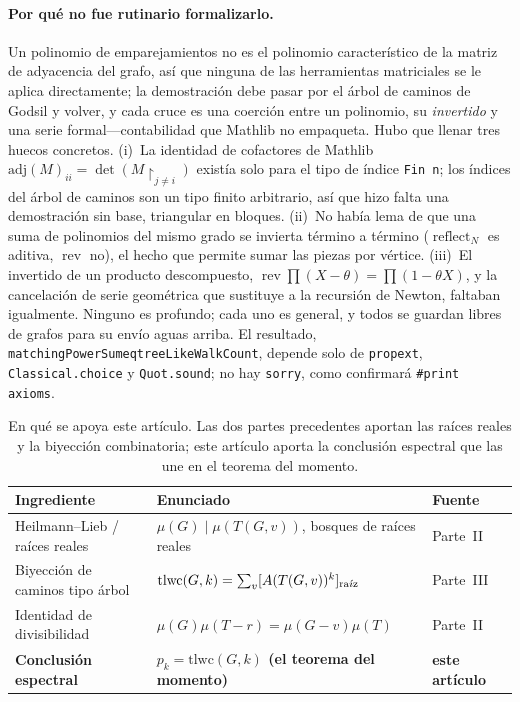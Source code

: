 \documentclass[11pt]{article}
\newcommand{\lean}[1]{{\def\_{\textunderscore\allowbreak}\texttt{#1}}}
\DeclareMathOperator{\reflect}{reflect}
\DeclareMathOperator{\rev}{rev}
\begin{document}
\paragraph{Por qu\'e no fue rutinario formalizarlo.} Un polinomio de emparejamientos no es el polinomio
caracter\'istico de la matriz de adyacencia del grafo, as\'i que ninguna de las herramientas matriciales se le aplica
directamente; la demostraci\'on debe pasar por el \'arbol de caminos de Godsil y volver, y cada cruce
es una coerci\'on entre un polinomio, su \emph{invertido} y una serie formal---contabilidad que Mathlib
no empaqueta. Hubo que llenar tres huecos concretos. (i)~La identidad de cofactores de Mathlib
$\mathrm{adj}(M)_{ii}=\det(M\!\restriction_{j\neq i})$ exist\'ia solo para el tipo de \'indice
\lean{Fin\,n}; los \'indices del \'arbol de caminos son un tipo finito arbitrario, as\'i que hizo falta
una demostraci\'on sin base, triangular en bloques. (ii)~No hab\'ia lema de que una suma de polinomios
del mismo grado se invierta t\'ermino a t\'ermino ($\reflect_N$ es aditiva, $\rev$ no), el hecho que
permite sumar las piezas por v\'ertice. (iii)~El invertido de un producto descompuesto,
$\rev\prod(X-\theta)=\prod(1-\theta X)$, y la cancelaci\'on de serie geom\'etrica que sustituye a la
recursi\'on de Newton, faltaban igualmente. Ninguno es profundo; cada uno es general, y todos se guardan
libres de grafos para su env\'io aguas arriba. El resultado, \lean{matchingPowerSum\_eq\_treeLikeWalkCount},
depende solo de \lean{propext}, \lean{Classical.choice} y \lean{Quot.sound}; no hay \lean{sorry}, como
confirmar\'a \lean{\#print axioms}.

\begin{table}[h]
\centering\small
\caption{En qu\'e se apoya este art\'iculo. Las dos partes precedentes aportan las ra\'ices reales y la
biyecci\'on combinatoria; este art\'iculo aporta la conclusi\'on espectral que las une en el teorema
del momento.}
\label{tab:deps}
\begin{tabular}{@{}lll@{}}
\toprule
\rowcolor{ggteal}
{\color{white}\textbf{Ingrediente}} & {\color{white}\textbf{Enunciado}} & {\color{white}\textbf{Fuente}}\\
\midrule
Heilmann--Lieb / ra\'ices reales & $\mu(G)\mid\mu(T(G,v))$, bosques de ra\'ices reales & Parte~II~\cite{PartII}\\
Biyecci\'on de caminos tipo \'arbol & $\mathrm{tlwc}(G,k)=\sum_v[A(T(G,v))^k]_{\rm ra\acute{\imath}z}$ & Parte~III~\cite{PartIII}\\
Identidad de divisibilidad & $\mu(G)\mu(T{-}r)=\mu(G{-}v)\mu(T)$ & Parte~II~\cite{PartII}\\
\textbf{Conclusi\'on espectral} & \textbf{$p_k=\mathrm{tlwc}(G,k)$ (el teorema del momento)} & \textbf{este art\'iculo}\\
\bottomrule
\end{tabular}
\end{table}
\end{document}
